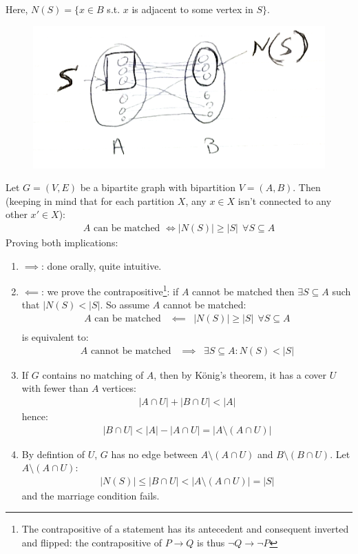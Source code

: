 Here, $N(S) = \{ x \in B $ s.t. $x$ is adjacent to some vertex in $S \}$.\\

\begin{figure}[H]
	\center
	\includegraphics{img/2-1.png}
\end{figure}  
Let $G = (V, E)$ be a bipartite graph with bipartition $V = (A, B)$. Then (keeping in mind that for each partition $X$, any $x \in X$ isn't connected to any other $x' \in X$):
\begin{eqnarray}
	A \text{ can be matched } \iff |N(S)| \geq |S| ~~\forall S \subseteq A
\end{eqnarray} 
Proving both implications:
\begin{enumerate}
	\item $\implies$: done orally, quite intuitive.
	\item $\impliedby$: we prove the contrapositive\footnote{The contrapositive of a statement has its antecedent and consequent inverted and flipped: the contrapositive of $P \rightarrow Q$ is thus $\neg Q \rightarrow \neg P$}: if $A$ cannot be matched then $\exists S \subseteq A$ such that $|N(S) < |S|$. So assume $A$ cannot be matched:
		\begin{eqnarray}
			A \text{ can be matched } &\impliedby& |N(S)| \geq |S| ~~\forall S \subseteq A \\
		\end{eqnarray}
		is equivalent to:
		\begin{eqnarray}
			A \text{ cannot be matched } &\implies& \exists S \subseteq A : N(S) < |S|
		\end{eqnarray} 
	\item If $G$ contains no matching of $A$, then by König's theorem, it has a cover $U$ with fewer than $A$ vertices:
		\begin{eqnarray}
			|A \cap U| + |B \cap U| < |A|
		\end{eqnarray}
		hence:
		\begin{eqnarray}
			|B \cap U| < |A| - |A \cap U| = |A \setminus (A \cap U)|
		\end{eqnarray}
	\item By defintion of $U$, $G$ has no edge between $A \setminus (A \cap U)$ and $B \setminus (B \cap U)$. Let $A \setminus (A \cap U)$:
		\begin{eqnarray}
			|N(S)| \leq |B \cap U| < |A \setminus (A \cap U)| = |S|
		\end{eqnarray} 
		and the marriage condition fails.
\end{enumerate}

